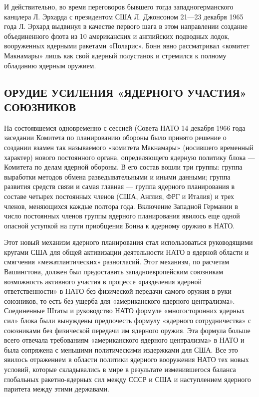\documentclass[12pt, a4paper, openany]{book}
\begin{document}
	И действительно, во время переговоров бывшего тогда западногерманского канцлера Л. Эрхарда с президентом США Л. Джонсоном 21—23 декабря 1965 года Л. Эрхард выдвинул в качестве первого шага в этом направлении создание объединенного флота из 10 американских и английских подводных лодок, вооруженных ядерными ракетами «Поларис». Бонн явно рассматривал «комитет Макнамары» лишь как свой ядерный полустанок и стремился к полному обладанию ядерным оружием.
	
	\subsection[Орудие усиления «ядерного участия» союзников]{\center ОРУДИЕ УСИЛЕНИЯ «ЯДЕРНОГО УЧАСТИЯ» СОЮЗНИКОВ}	
	
	На состоявшемся одновременно с сессией (Совета НАТО 14 декабря 1966 года заседании Комитета по планированию обороны было принято решение о создании взамен так называемого «комитета Макнамары» (носившего временный характер) нового постоянного органа, определяющего ядерную политику блока — Комитета по делам ядерной обороны. В его состав вошли три группы: группа выработки методов обмена разведывательными и иными данными; группа развития средств связи и самая главная — группа ядерного планирования в составе четырех постоянных членов (США, Англия, ФРГ и Италия) и трех членов, меняющихся каждые полтора года. Включение Западной Германии в число постоянных членов группы ядерного планирования явилось еще одной опасной уступкой на пути приобщения Бонна к ядерному оружию в НАТО.
	
	Этот новый механизм ядерного планирования стал использоваться руководящими кругами США для общей активизации деятельности НАТО в ядерной области и смягчения «межатлантических» разногласий. Этот механизм, по расчетам Вашингтона, должен был предоставить западноевропейским союзникам возможность активного участия в процессе «разделения ядерной ответственности» в НАТО без физической передачи самого оружия в руки союзников, то есть без ущерба для «американского ядерного централизма». Соединенные Штаты и руководство НАТО формуле «многосторонних ядерных сил» блока были вынуждены предпочесть формулу «ядерного сотрудничества» с союзниками без физической передачи им ядерного оружия. Эта формула больше всего отвечала требованиям «американского ядерного централизма» в НАТО и была сопряжена с меньшими политическими издержками для США. Все это явилось отражением в области политики ядерного вооружения НАТО тех новых условий, которые складывались в мире в результате изменившегося баланса глобальных ракетно-ядерных сил между СССР и США и наступлением ядерного паритета между этими державами.
	
\end{document}
